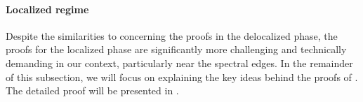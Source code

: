 \documentclass[10pt,reqno]{amsart}
\numberwithin{equation}{section}
\numberwithin{figure}{section}
\theoremstyle{plain} %
\theoremstyle{definition} %
\numberwithin{equation}{section}
\begin{document}


\medskip

\paragraph{\bf Localized regime} 
Despite the similarities to \cite{stone2024randommatrixmodelquantum} concerning the proofs in the delocalized phase, the proofs for the localized phase are significantly more challenging and technically demanding in our context, particularly near the spectral edges. 
In the remainder of this subsection, we will focus on explaining the key ideas behind the proofs of .
The detailed proof will be presented in .
\end{document}
